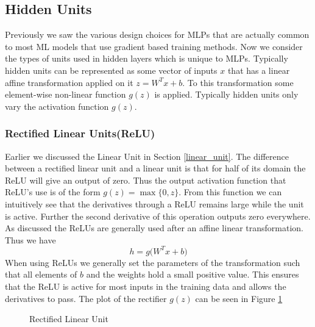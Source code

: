 \documentclass[14pt]{extarticle}
\numberwithin{equation}{section}
\begin{document}
		\subsection{Hidden Units}
		Previously we saw the various design choices for MLPs that are actually common to most ML models that use gradient based training methods. Now we consider the types of units used in hidden layers which is unique to MLPs. Typically hidden units can be represented as some vector of inputs $x$ that has a linear affine transformation applied on it $z = W^Tx + b$. To this transformation some element-wise non-linear function $g(z)$ is applied. Typically hidden units only vary the activation function $g(z)$.
		\subsubsection{Rectified Linear Units(ReLU)}
		Earlier we discussed the Linear Unit in Section \ref{linear_unit}. The difference between a rectified linear unit and a linear unit is that for half of its domain the ReLU will give an output of zero. Thus the output activation function that ReLU's use is of the form $g(z) = \max \{0,z\}$. From this function we can intuitively see that the derivatives through a ReLU remains large while the unit is active. Further the second derivative of this operation outputs zero everywhere. As discussed the ReLUs are generally used after an affine linear transformation. Thus we have
		\begin{equation}
		h = g\big(W^Tx + b\big)
		\end{equation}
		When using ReLUs we generally set the parameters of the transformation such that all elements of $b$ and the weights hold a small positive value. This ensures that the ReLU is active for most inputs in the training data and allows the derivatives to pass. The plot of the rectifier $g(z)$ can be seen in Figure \ref{relu}
		\begin{figure}[H]
			\centering
			\setlength{\fboxsep}{5pt}%
			\setlength{\fboxrule}{1pt}%
			\caption{Rectified Linear Unit
				\label{relu}}
		\end{figure}
\end{document}
